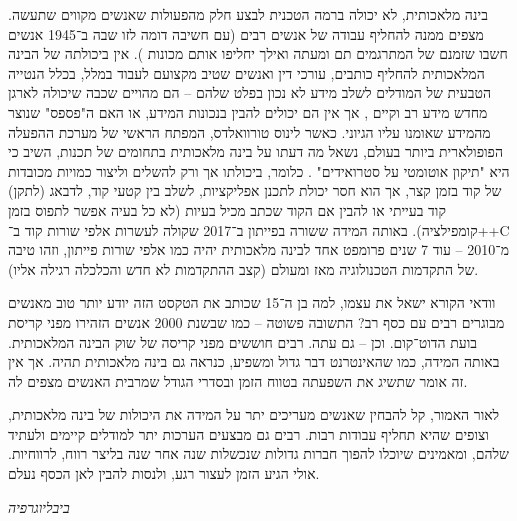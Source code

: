 \documentclass[]{article}
\newcommand\bs        {\blacksquare}
\theoremstyle{definition}
\begin{document}
	בינה מלאכותית, לא יכולה ברמה הטכנית לבצע חלק מהפעולות שאנשים מקווים שתעשה. מצפים ממנה להחליף עבודה של אנשים רבים (עם חשיבה דומה לזו שבה ב־1945 אנשים חשבו שזמנם של המתרגמים תם ומעתה ואילך יחליפו אותם מכונות \cite{Trans}). אין ביכולתה של הבינה המלאכותית להחליף כותבים, עורכי דין ואנשים שטיב מקצועם לעבוד במלל, בכלל הנטייה הטבעית של המודלים לשלב מידע לא נכון בפלט שלהם – הם מהויים שכבה שיכולה לארגן מחדש מידע רב וקיים \cite{somethingihaventread}, אך אין הם יכולים להבין בנכונות המידע, או האם ה"פספס" שנוצר מהמידע שאומנו עליו הגיוני. כאשר לינוס טורוואלדס, המפתח הראשי של מערכת ההפעלה הפופולארית ביותר בעולם, נשאל מה דעתו על בינה מלאכותית בתחומים של תכנות, השיב כי היא "תיקון אוטומטי על סטרואידים" \cite{drugs}. כלומר, ביכולתו אך ורק להשלים וליצור כמויות מכובדות של קוד בזמן קצר, אך הוא חסר יכולת לתכנן אפליקציות, לשלב בין קטעי קוד, לדבאג (לתקן) קוד בעייתי או להבין אם הקוד שכתב מכיל בעיות (לא כל בעיה אפשר לתפוס בזמן קומפילציה). באותה המידה ששורה בפייתון ב־2017 שקולה לעשרות אלפי שורות קוד ב־++C מ־2010 – עוד 7 שנים פרומפט אחד לבינה מלאכותית יהיה כמו אלפי שורות פייתון, וזהו טיבה של התקדמות הטכנולוגיה מאז ומעולם (קצב ההתקדמות לא חדש והכלכלה רגילה אליו). 
	
	וודאי הקורא ישאל את עצמו, למה בן ה־15 שכותב את הטקסט הזה יודע יותר טוב מאנשים מבוגרים רבים עם כסף רב? התשובה פשוטה – כמו שבשנת 2000 אנשים הזהירו מפני קריסת בועת הדוט־קום. וכן – גם עתה. רבים חוששים מפני קריסה של שוק הבינה המלאכותית. באותה המידה, כמו שהאינטרנט דבר גדול ומשפיע, כנראה גם בינה מלאכותית תהיה. אך אין זה אומר שתשיג את השפעתה בטווח הזמן ובסדרי הגודל שמרבית האנשים מצפים לה. 
	
	לאור האמור, קל להבחין שאנשים מעריכים יתר על המידה את היכולות של בינה מלאכותית, וצופים שהיא תחליף עבודות רבות. רבים גם מבצעים הערכות יתר למודלים קיימים ולעתיד שלהם, ומאמינים שיוכלו להפוך חברות גדולות שנכשלות שנה אחר שנה בליצר רווח, לרווחיות. אולי הגיע הזמן לעצור רגע, ולנסות להבין לאן הכסף נעלם. 
	\hfill \bs
	
	\vfil
	\hfil \Large \textit{ביבליוגרפיה} \normalsize
	
		\renewcommand{\section}[2]{}
		
\end{document}
